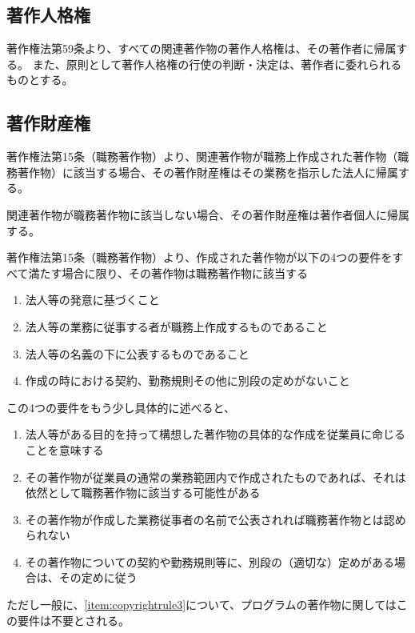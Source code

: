 \subsection{著作人格権}
著作権法第59条より、すべての関連著作物の著作人格権は、その著作者に帰属する。
また、原則として著作人格権の行使の判断・決定は、著作者に委れられるものとする。


\subsection{著作財産権}
著作権法第15条（職務著作物）より、関連著作物が職務上作成された著作物（職務著作物）に該当する場合、その著作財産権はその業務を指示した法人に帰属する。

関連著作物が職務著作物に該当しない場合、その著作財産権は著作者個人に帰属する。



\clearpage
著作権法第15条（職務著作物）より、作成された著作物が以下の4つの要件をすべて満たす場合に限り、その著作物は職務著作物に該当する
\begin{enumerate}[label=\Roman*, ref=\Roman*]
\item 法人等の発意に基づくこと
\item 法人等の業務に従事する者が職務上作成するものであること
\item\label{item:copyrightrule3} 法人等の名義の下に公表するものであること
\item 作成の時における契約、勤務規則その他に別段の定めがないこと
\end{enumerate}
この4つの要件をもう少し具体的に述べると、
\begin{enumerate}[label=\Roman*$'$]
\item 法人等がある目的を持って構想した著作物の具体的な作成を従業員に命じることを意味する
\item その著作物が従業員の通常の業務範囲内で作成されたものであれば、それは依然として職務著作物に該当する可能性がある
\item その著作物が作成した業務従事者の名前で公表されれば職務著作物とは認められない
\item その著作物についての契約や勤務規則等に、別段の（適切な）定めがある場合は、その定めに従う
\end{enumerate}
ただし一般に、\ref{item:copyrightrule3}{}について、プログラムの著作物に関してはこの要件は不要とされる。



